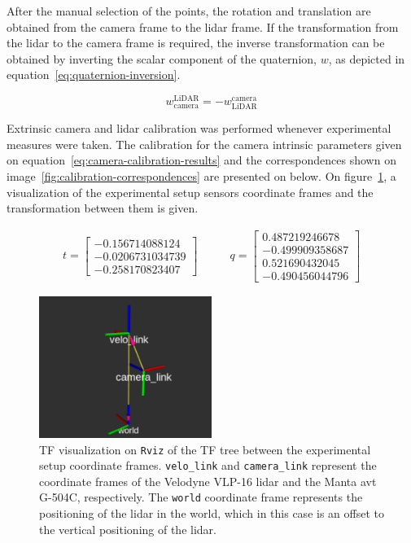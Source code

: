 After the manual selection of the points, the rotation and translation are obtained from the camera frame to the \ac{lidar} frame. If the transformation from the \ac{lidar} to the camera frame is required, the inverse transformation can be obtained by inverting the scalar component of the quaternion, $w$, as depicted in equation~\eqref{eq:quaternion-inversion}. 

\begin{equation}
	\label{eq:quaternion-inversion}
	w^\text{LiDAR}_\text{camera} = - w^\text{camera}_\text{LiDAR}
\end{equation}

Extrinsic camera and \ac{lidar} calibration was performed whenever experimental measures were taken. The calibration for the camera intrinsic parameters given on equation~\eqref{eq:camera-calibration-results} and the correspondences shown on image~\ref{fig:calibration-correspondences} are presented on below. On figure~\ref{fig:extrinsic-calibration-frames}, a visualization of the experimental setup sensors coordinate frames and the transformation between them is given.

\begin{subequations}
	\label{eq:camera-to-lidar-transform}
	\begin{align}
		t = \begin{bmatrix}
			-0.156714088124  \\
			-0.0206731034739 \\
			-0.258170823407
		\end{bmatrix} \nonumber
		& \qquad
		q = \begin{bmatrix} 
		0.487219246678  \\
		-0.499909358687 \\
		0.521690432045  \\
		-0.490456044796
	\end{bmatrix} \nonumber
	\end{align}
\end{subequations}

\begin{figure}[H]
	\centering
	\includegraphics[width=0.5\textwidth]{img/calibration/extrinsic-calibration-frames.png}
	\caption{TF visualization on \texttt{Rviz} of the TF tree between the experimental setup coordinate frames. \texttt{velo\_link} and \texttt{camera\_link} represent the coordinate frames of the Velodyne VLP-16 \ac{lidar} and the Manta \ac{avt} G-504C, respectively. The \texttt{world} coordinate frame represents the positioning of the \ac{lidar} in the world, which in this case is an offset to the vertical positioning of the \ac{lidar}.}
	\label{fig:extrinsic-calibration-frames}
\end{figure}

